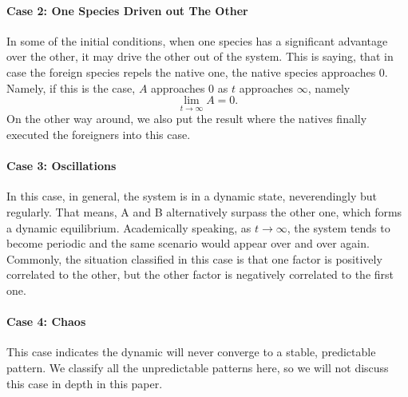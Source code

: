 \documentclass[12pt]{article}
\begin{document}
\paragraph{Case 2: One Species Driven out The Other} In some of the initial conditions, when one species has a significant advantage over the other, it may drive the other out of the system. This is saying, that in case the foreign species repels the native one, the native species approaches $0$. Namely, if this is the case, $A$ approaches $0$ as $t$ approaches $\infty$, namely
\begin{equation}
    \lim_{t\to \infty} A=0.
\end{equation}
On the other way around, we also put the result where the natives finally executed the foreigners into this case.
       
\paragraph{Case 3: Oscillations} 
In this case, in general, the system is in a dynamic state, neverendingly but regularly. That means, A and B alternatively surpass the other one, which forms a dynamic equilibrium. Academically speaking, as $t\to\infty$, the system tends to become periodic and the same scenario would appear over and over again. Commonly, the situation classified in this case is that one factor is positively correlated to the other, but the other factor is negatively correlated to the first one.

\paragraph{Case 4: Chaos} This case indicates the dynamic will never converge to a stable, predictable pattern. We classify all the unpredictable patterns here, so we will not discuss this case in depth in this paper.
\end{document}
